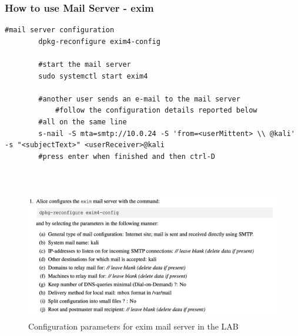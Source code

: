 \clearpage
\subsubsection{How to use Mail Server - exim}

    \begin{lstlisting}[style=bashStyle]
        #mail server configuration
        dpkg-reconfigure exim4-config

        #start the mail server
        sudo systemctl start exim4

        #another user sends an e-mail to the mail server
            #follow the configuration details reported below
        #all on the same line
        s-nail -S mta=smtp://10.0.24 -S 'from=<userMittent> \\ @kali' -s "<subjectText>" <userReceiver>@kali
        #press enter when finished and then ctrl-D
        
        
    \end{lstlisting}
\begin{figure}[H]
    \includegraphics[width=\linewidth]{Images/LABs/exim4config.png}

    \caption{Configuration parameters for exim mail server in the LAB}
    \label{fig:exim4configuration}
    
\end{figure}

\clearpage
